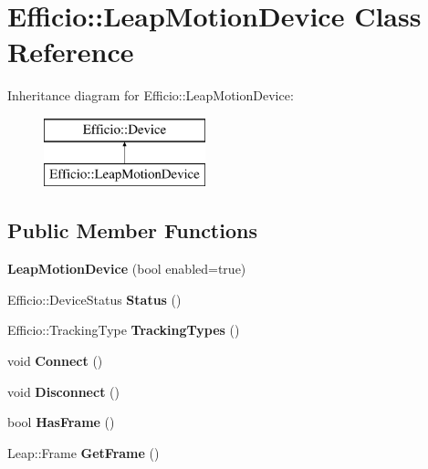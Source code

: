 \hypertarget{class_efficio_1_1_leap_motion_device}{}\section{Efficio\+:\+:Leap\+Motion\+Device Class Reference}
\label{class_efficio_1_1_leap_motion_device}
Inheritance diagram for Efficio\+:\+:Leap\+Motion\+Device\+:\begin{figure}[H]
\begin{center}
\leavevmode
\includegraphics[height=2.000000cm]{class_efficio_1_1_leap_motion_device}
\end{center}
\end{figure}
\subsection*{Public Member Functions}
\begin{DoxyCompactItemize}
\item 
{\bfseries Leap\+Motion\+Device} (bool enabled=true)\hypertarget{class_efficio_1_1_leap_motion_device_a4c7db230fdb484f9b97ca95328e43f49}{}\label{class_efficio_1_1_leap_motion_device_a4c7db230fdb484f9b97ca95328e43f49}

\item 
Efficio\+::\+Device\+Status {\bfseries Status} ()\hypertarget{class_efficio_1_1_leap_motion_device_aa8da27f1e5cbd65e88534f15df701914}{}\label{class_efficio_1_1_leap_motion_device_aa8da27f1e5cbd65e88534f15df701914}

\item 
Efficio\+::\+Tracking\+Type {\bfseries Tracking\+Types} ()\hypertarget{class_efficio_1_1_leap_motion_device_a6234ba513473646dd7bf779d13e6c8ef}{}\label{class_efficio_1_1_leap_motion_device_a6234ba513473646dd7bf779d13e6c8ef}

\item 
void {\bfseries Connect} ()\hypertarget{class_efficio_1_1_leap_motion_device_a72bff092872814da4aec665b1fb09b5f}{}\label{class_efficio_1_1_leap_motion_device_a72bff092872814da4aec665b1fb09b5f}

\item 
void {\bfseries Disconnect} ()\hypertarget{class_efficio_1_1_leap_motion_device_aabe3f50f1a03994d5fd91d8aec615ff6}{}\label{class_efficio_1_1_leap_motion_device_aabe3f50f1a03994d5fd91d8aec615ff6}

\item 
bool {\bfseries Has\+Frame} ()\hypertarget{class_efficio_1_1_leap_motion_device_ad5a6c2c51426dd7544912d0d729984f6}{}\label{class_efficio_1_1_leap_motion_device_ad5a6c2c51426dd7544912d0d729984f6}

\item 
Leap\+::\+Frame {\bfseries Get\+Frame} ()\hypertarget{class_efficio_1_1_leap_motion_device_ad8069e5e4c4fc0033b0b19c703a89a0d}{}\label{class_efficio_1_1_leap_motion_device_ad8069e5e4c4fc0033b0b19c703a89a0d}

\end{DoxyCompactItemize}
